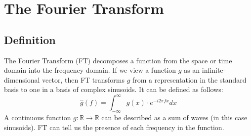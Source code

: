 \section{The Fourier Transform\label{sec:fourier}}
\subsection{Definition}
The Fourier Transform (FT) decomposes a function
from the space or time domain into the frequency domain.
If we view a function $g$ as an infinite-dimensional vector,
then FT transforms $g$ from a representation in the standard basis
to one in a basis of complex sinusoids.
It can be defined as follows:
%
\begin{equation}
     \hat g(f) = \int_{-\infty}^{\infty} g(x) \cdot e^{-i 2 \pi f x} dx
\end{equation}
%
A continuous function $g: \mathbb{R} \rightarrow \mathbb{R}$
can be described as a sum of waves (in this case sinusoids).
FT can tell us the presence of each frequency in the function.

